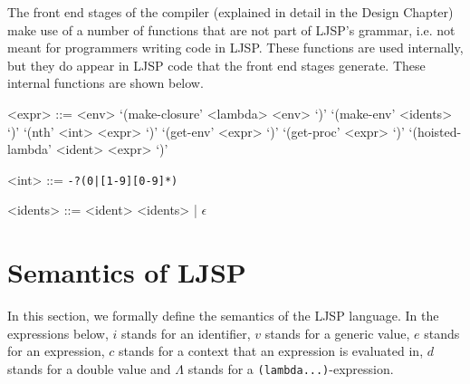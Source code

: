 \documentclass[11pt]{report}
\begin{document}
The front end stages of the compiler (explained in detail in the Design Chapter) make use of a number of functions that are not part of LJSP's grammar, i.e. not meant for programmers writing code in LJSP. These functions are used internally, but they do appear in LJSP code that the front end stages generate. These internal functions are shown below.

\begin{grammar}
<expr> ::= <env>
\alt `(make-closure' <lambda> <env> `)'
\alt `(make-env' <idents> `)'
\alt `(nth' <int> <expr> `)'
\alt `(get-env' <expr> `)'
\alt `(get-proc' <expr> `)'
\alt `(hoisted-lambda' <ident> <expr> `)'

<int> ::= \texttt{-?(0|[1-9][0-9]*)}

<idents> ::= <ident> <idents> | $\epsilon$
\end{grammar}


\section{Semantics of LJSP}
In this section, we formally define the semantics of the LJSP language. In the expressions below, $i$ stands for an identifier, $v$ stands for a generic value, $e$ stands for an expression, $c$ stands for a context that an expression is evaluated in, $d$ stands for a double value and $\Lambda$ stands for a \texttt{(lambda...)}-expression.

\end{document}
